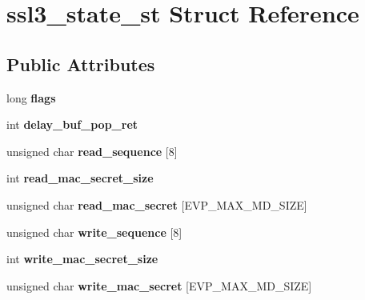\hypertarget{structssl3__state__st}{}\section{ssl3\+\_\+state\+\_\+st Struct Reference}
\label{structssl3__state__st}
\subsection*{Public Attributes}
\begin{DoxyCompactItemize}
\item 
\mbox{\label{structssl3__state__st_a8565ca9c9bebf7a771a99ef035ff6503}} 
long {\bfseries flags}
\item 
\mbox{\label{structssl3__state__st_a27a3b6185c010f82d22bfcd7feb5a43f}} 
int {\bfseries delay\+\_\+buf\+\_\+pop\+\_\+ret}
\item 
\mbox{\label{structssl3__state__st_a0d46ad2e211a7ba8fb712e66cf451d31}} 
unsigned char {\bfseries read\+\_\+sequence} \mbox{[}8\mbox{]}
\item 
\mbox{\label{structssl3__state__st_a5f9e172ca1b931c4bb0bb44e80898d15}} 
int {\bfseries read\+\_\+mac\+\_\+secret\+\_\+size}
\item 
\mbox{\label{structssl3__state__st_a650dfa61b083a05fafa16b3c62d6fe69}} 
unsigned char {\bfseries read\+\_\+mac\+\_\+secret} \mbox{[}E\+V\+P\+\_\+\+M\+A\+X\+\_\+\+M\+D\+\_\+\+S\+I\+ZE\mbox{]}
\item 
\mbox{\label{structssl3__state__st_a0ce6af56e080899190f33ebf954979ff}} 
unsigned char {\bfseries write\+\_\+sequence} \mbox{[}8\mbox{]}
\item 
\mbox{\label{structssl3__state__st_a916b1cd43d422b48e52b779e79432b5c}} 
int {\bfseries write\+\_\+mac\+\_\+secret\+\_\+size}
\item 
\mbox{\label{structssl3__state__st_a2b686268d62c7756883eea3d9f77926a}} 
unsigned char {\bfseries write\+\_\+mac\+\_\+secret} \mbox{[}E\+V\+P\+\_\+\+M\+A\+X\+\_\+\+M\+D\+\_\+\+S\+I\+ZE\mbox{]}

\end{DoxyCompactItemize}
